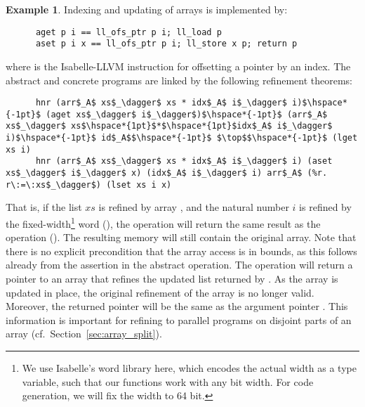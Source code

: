 \documentclass[sn-mathphys,Numbered]{sn-jnl}
\theoremstyle{thmstyleone}%
\theoremstyle{definition}%
\newtheorem{example}{Example}%
\theoremstyle{thmstylethree}%
\begin{document}
\begin{example}
    Indexing and updating of arrays is implemented by:
    \begin{lstlisting}
      aget p i == ll_ofs_ptr p i; ll_load p
      aset p i x == ll_ofs_ptr p i; ll_store x p; return p
    \end{lstlisting}
    where  is the Isabelle-LLVM instruction for offsetting a pointer by an index.
    The abstract and concrete programs are linked by the following refinement theorems:
    \begin{lstlisting}
      hnr (arr$_A$ xs$_\dagger$ xs * idx$_A$ i$_\dagger$ i)$\hspace*{-1pt}$ (aget xs$_\dagger$ i$_\dagger$)$\hspace*{-1pt}$ (arr$_A$ xs$_\dagger$ xs$\hspace*{1pt}$*$\hspace*{1pt}$idx$_A$ i$_\dagger$ i)$\hspace*{-1pt}$ id$_A$$\hspace*{-1pt}$ $\top$$\hspace*{-1pt}$ (lget xs i)
      hnr (arr$_A$ xs$_\dagger$ xs * idx$_A$ i$_\dagger$ i) (aset xs$_\dagger$ i$_\dagger$ x) (idx$_A$ i$_\dagger$ i) arr$_A$ (%r. r\:=\:xs$_\dagger$) (lset xs i x)
    \end{lstlisting}
    That is, if the list \is$xs$ is refined by array , and the natural number \is$i$ is refined
    by the fixed-width\footnote{We use Isabelle's word library here, which encodes the actual width as a type variable,
    such that our functions work with any bit width. For code generation, we will fix the width to 64 bit.} word  (),
    the  operation will return the same result as the  operation ().
    The resulting memory will still contain the original array. Note that there is no explicit precondition that the array access
    is in bounds, as this follows already from the assertion in the abstract  operation.
    The  operation will return a pointer to an array that refines the updated list returned by .
    As the array is updated in place, the original refinement of the array is no longer valid.
    Moreover, the returned pointer  will be the same as the argument pointer .
    This information is important for refining to parallel programs on disjoint parts of an
    array (cf.\ Section~\ref{sec:array_split}).


\end{example}
\end{document}
